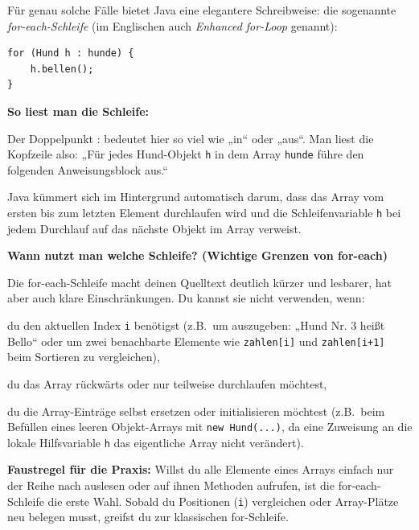 Für genau solche Fälle bietet Java eine elegantere Schreibweise: die sogenannte 
\emph{for-each-Schleife} (im Englischen auch \emph{Enhanced for-Loop} genannt):

\begin{lstlisting}
for (Hund h : hunde) {
    h.bellen();
}
\end{lstlisting}

\textbf{So liest man die Schleife:}

Der Doppelpunkt : bedeutet hier so viel wie „in“ oder „aus“. Man liest die 
Kopfzeile also: „Für jedes Hund-Objekt \lstinline|h| in dem Array \lstinline|hunde|
führe den folgenden Anweisungsblock aus.“

Java kümmert sich im Hintergrund automatisch darum, dass das Array vom ersten 
bis zum letzten Element durchlaufen wird und die Schleifenvariable \lstinline|h| 
bei jedem Durchlauf auf das nächste Objekt im Array verweist.

\textbf{Wann nutzt man welche Schleife? (Wichtige Grenzen von for-each)}

Die for-each-Schleife macht deinen Quelltext deutlich kürzer und lesbarer, hat aber 
auch klare Einschränkungen. Du kannst sie nicht verwenden, wenn:

\begin{compactitem}
\item du den aktuellen Index \lstinline|i| benötigst (z.B.\ um auszugeben: 
„Hund Nr. 3 heißt Bello“ oder um zwei benachbarte Elemente wie \lstinline|zahlen[i]| und 
\lstinline|zahlen[i+1]| beim Sortieren zu vergleichen),
\item du das Array rückwärts oder nur teilweise durchlaufen möchtest,
\item du die Array-Einträge selbst ersetzen oder initialisieren möchtest 
(z.B.\ beim Befüllen eines leeren Objekt-Arrays mit \lstinline|new Hund(...)|, da 
eine Zuweisung an die lokale Hilfsvariable \lstinline|h| das eigentliche Array nicht 
verändert).
\end{compactitem}

\textbf{Faustregel für die Praxis:} Willst du alle Elemente eines Arrays einfach 
nur der Reihe nach auslesen oder auf ihnen Methoden aufrufen, ist die for-each-Schleife 
die erste Wahl. Sobald du Positionen (\lstinline|i|) vergleichen oder Array-Plätze neu 
belegen musst, greifst du zur klassischen for-Schleife.



